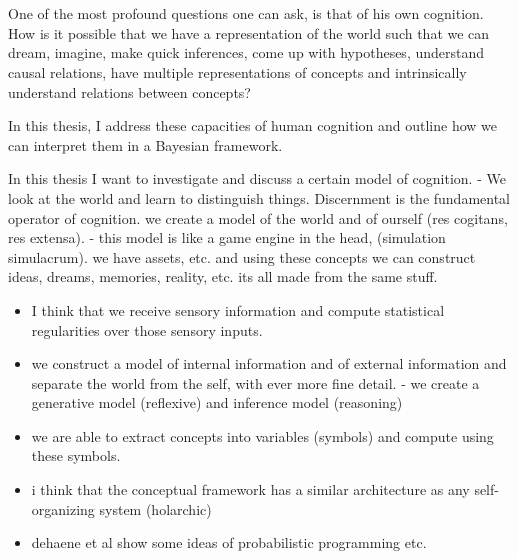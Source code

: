 \section{}
One of the most profound questions one can ask, is that of his own cognition. How is it possible that we have a representation of the world such that we can dream, imagine, make quick inferences, come up with hypotheses, understand causal relations, have multiple representations of concepts and intrinsically understand relations between concepts?

In this thesis, I address these capacities of human cognition and outline how we can interpret them in a Bayesian framework.


In this thesis I want to investigate and discuss a certain model of cognition.
- We look at the world and learn to distinguish things. Discernment is the fundamental operator of cognition.
we create a model of the world and of ourself (res cogitans, res extensa).
- this model is like a game engine in the head, (simulation simulacrum). we have assets, etc. and using these concepts we can construct ideas, dreams, memories, reality, etc. its all made from the same stuff.






\begin{itemize}
    \item I think that we receive sensory information and compute statistical regularities over those sensory inputs. 
    \item we construct a model of internal information and of external information and separate the world from the self, with ever more fine detail. - we create a generative model (reflexive) and inference model (reasoning)
    \item we are able to extract concepts into variables (symbols) and compute using these symbols.
    \item i think that the conceptual framework has a similar architecture as any self-organizing system (holarchic)
    \item dehaene et al show some ideas of probabilistic programming etc. 
\end{itemize}



